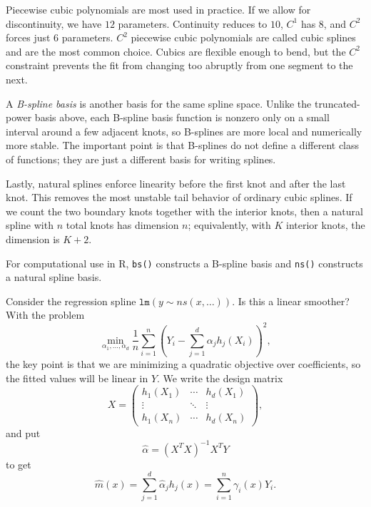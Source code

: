 Piecewise cubic polynomials are most used in practice. If we allow for discontinuity, we have $12$ parameters. Continuity reduces to $10$, $C^1$ has $8$, and $C^2$ forces just $6$ parameters. $C^2$ piecewise cubic polynomials are called cubic splines and are the most common choice. Cubics are flexible enough to bend, but the $C^2$ constraint prevents the fit from changing too abruptly from one segment to the next.

A \emph{B-spline basis} is another basis for the same spline space. Unlike the truncated-power basis above, each B-spline basis function is nonzero only on a small interval around a few adjacent knots, so B-splines are more local and numerically more stable. The important point is that B-splines do not define a different class of functions; they are just a different basis for writing splines.

Lastly, natural splines enforce linearity before the first knot and after the last knot. This removes the most unstable tail behavior of ordinary cubic splines. If we count the two boundary knots together with the interior knots, then a natural spline with $n$ total knots has dimension $n$; equivalently, with $K$ interior knots, the dimension is $K+2$.

For computational use in R, \texttt{bs()} constructs a B-spline basis and \texttt{ns()} constructs a natural spline basis.

Consider the regression spline $\texttt{lm}(y \sim ns(x,\ldots))$. Is this a linear smoother? 
With the problem \[
		\min_{\alpha_1,\ldots,\alpha_d} \frac{1}{n} \sum\limits_{i=1}^{n} \left( Y_i - \sum\limits_{j=1}^{d} \alpha_j h_j(X_i) \right)^2
,\] 
the key point is that we are minimizing a quadratic objective over coefficients, so the fitted values will be linear in $Y$.
We write the design matrix \[
		X =
		\begin{pmatrix}
		h_1(X_1) & \cdots & h_d(X_1) \\
		\vdots & \ddots & \vdots \\
		h_1(X_n) & \cdots & h_d(X_n)
	\end{pmatrix} 
,\] and put \[
	\hat{\alpha} = \left( X^T X \right)^{-1} X^T Y
	\] to get \[
		\hat{m}(x) = \sum\limits_{j=1}^{d} \hat{\alpha}_j h_j(x) = \sum\limits_{i=1}^{n} \gamma_i(x) Y_i
.\] 

